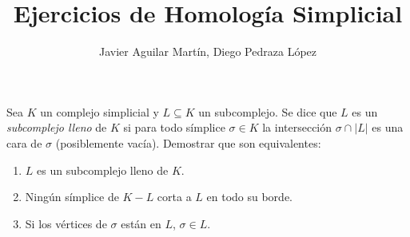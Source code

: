 \documentclass[twoside]{article}
\begin{document}
\title{Ejercicios de Homología Simplicial}
\author{Javier Aguilar Martín, Diego Pedraza López}
\maketitle

\begin{ejercicio}{1.1}
Sea $K$ un complejo simplicial y $L \subseteq K$ un subcomplejo.
Se dice que $L$ es un \emph{subcomplejo lleno} de $K$ si para todo símplice $σ \in K$ la intersección $σ \cap |L|$ es una cara de $σ$ (posiblemente vacía).
Demostrar que son equivalentes:
\begin{enumerate}
\item $L$ es un subcomplejo lleno de $K$.
\item Ningún símplice de $K-L$ corta a $L$ en todo su borde.
\item Si los vértices de $σ$ están en $L$, $σ \in L$.
\end{enumerate}
\end{ejercicio}
\end{document}
